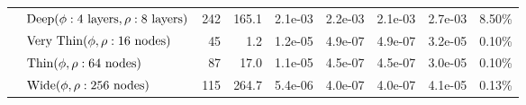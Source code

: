 \begin{tabular}{llrrrrrrr}
                         & $\textup{Deep} (\phi:\textup{4 layers},  \rho:\textup{8 layers})$ &                      242 &                     165.1 &                                   2.1e-03 &                                  2.2e-03 &                                 2.1e-03 &                                            2.7e-03 &                                             8.50\% \\
                         & $\textup{Very Thin} (\phi,\rho:\textup{16 nodes})$ &                       45 &                       1.2 &                                   1.2e-05 &                                  4.9e-07 &                                 4.9e-07 &                                            3.2e-05 &                                             0.10\% \\
                         & $\textup{Thin} (\phi,\rho:\textup{64 nodes})$ &                       87 &                      17.0 &                                   1.1e-05 &                                  4.5e-07 &                                 4.5e-07 &                                            3.0e-05 &                                             0.10\% \\
                         & $\textup{Wide} (\phi,\rho:\textup{256 nodes})$ &                      115 &                     264.7 &                                   5.4e-06 &                                  4.0e-07 &                                 4.0e-07 &                                            4.1e-05 &                                             0.13\% \\
\bottomrule
\end{tabular}
